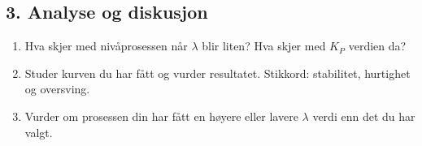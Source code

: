 \documentclass[a4paper,11pt]{article}
\begin{document}
\subsection*{3. Analyse og diskusjon}
\begin{enumerate}
    \item Hva skjer med nivåprosessen når $\lambda$ blir liten?  Hva skjer med $K_P$ verdien da? 
    \item Studer kurven du har fått og vurder resultatet. Stikkord: stabilitet, hurtighet og oversving.  
    \item Vurder om prosessen din har fått en høyere eller lavere  $\lambda$ verdi enn det du har valgt.
\end{enumerate}
\end{document}
